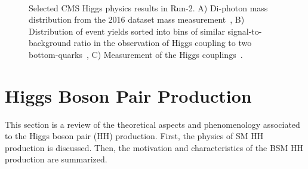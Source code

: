 \begin{figure}[ht!]
\captionsetup[subfigure]{justification=centering}
\centering
{}
\\
\caption[Selected CMS Higgs physics results in Run-2]{Selected CMS Higgs physics results in Run-2. A) Di-photon mass distribution from the 2016 dataset mass measurement~\cite{cmsbesthmassrun2}, B) Distribution of event yields sorted into bins of similar signal-to-background ratio in the observation of Higgs coupling to two bottom-quarks~\cite{cmsrun2_hbb}, C) Measurement of the Higgs couplings~\cite{cmsrun2_hmumu}.}
\label{fig:LHCHiggsmeasurements}
\end{figure}
   
\clearpage
\section{Higgs Boson Pair Production}
This section is a review of the theoretical aspects and phenomenology associated to the Higgs boson pair (HH) production. First, the physics of SM HH production is discussed. Then, the motivation and characteristics of the BSM HH production are summarized. 

